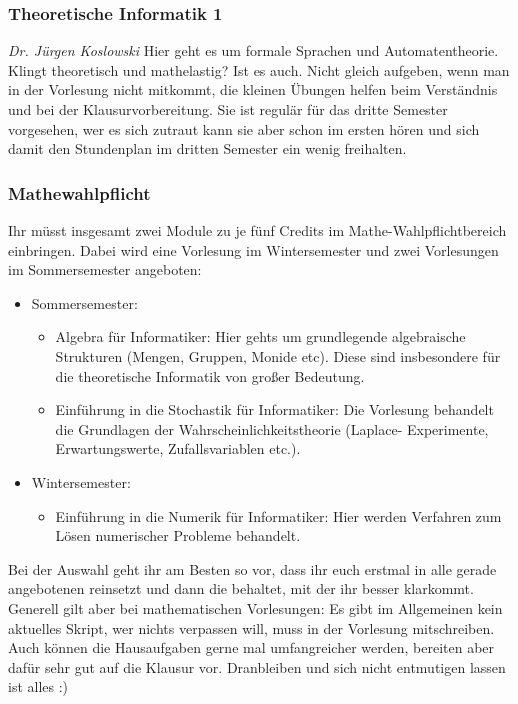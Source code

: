\subsubsection{Theoretische Informatik 1}
	\textit{Dr. Jürgen Koslowski}
	Hier geht es um formale Sprachen und Automatentheorie. Klingt theoretisch und mathelastig? Ist es auch. Nicht gleich aufgeben, wenn man in der Vorlesung nicht mitkommt, die kleinen Übungen helfen beim Verständnis und bei der Klausurvorbereitung. Sie ist regulär für das dritte Semester vorgesehen, wer es sich zutraut kann sie aber schon im ersten hören und sich damit den Stundenplan im dritten Semester ein wenig freihalten. 
\subsubsection{Mathewahlpflicht}
Ihr müsst insgesamt zwei Module zu je fünf Credits
	im Mathe-Wahlpflichtbereich einbringen. Dabei wird eine Vorlesung im Wintersemester und zwei
	Vorlesungen im Sommersemester	angeboten:
	\begin{itemize}
	  \item Sommersemester: 
	    \begin{itemize} 
	      \item Algebra für Informatiker: Hier gehts um grundlegende
		algebraische Strukturen (Mengen, Gruppen, Monide etc). Diese sind insbesondere für die
		theoretische Informatik von großer Bedeutung.
	      \item Einführung in die Stochastik für Informatiker: Die
		Vorlesung behandelt die Grundlagen der
		Wahrscheinlichkeitstheorie (Laplace- Experimente,
		Erwartungswerte, Zufallsvariablen etc.). 
	    \end{itemize}
	  \item Wintersemester: 
	    \begin{itemize}
	      \item Einführung in die Numerik für Informatiker: Hier
		werden Verfahren zum Lösen numerischer Probleme
		behandelt. 
	    \end{itemize}
	\end{itemize}
	Bei der Auswahl geht ihr am Besten so vor, dass ihr euch erstmal
	in alle gerade angebotenen reinsetzt und dann die behaltet, mit der ihr besser
	klarkommt. Generell gilt aber bei mathematischen Vorlesungen: Es
	gibt im Allgemeinen kein aktuelles Skript, wer nichts verpassen
	will, muss in der Vorlesung mitschreiben. Auch können die
	Hausaufgaben gerne mal umfangreicher werden, bereiten aber dafür
	sehr gut auf die Klausur vor. Dranbleiben und sich nicht
	entmutigen lassen ist alles :)
